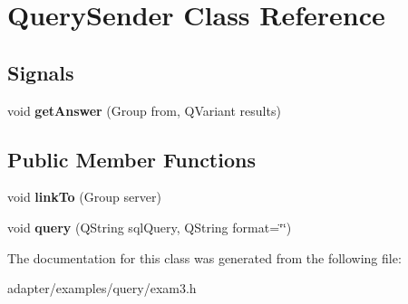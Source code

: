 \hypertarget{classQuerySender}{
\section{QuerySender Class Reference}
\label{classQuerySender}
}
\subsection*{Signals}
\begin{DoxyCompactItemize}
\item 
\hypertarget{classQuerySender_ae0295b63e8c81d285f83f152db5fe724}{
void {\bfseries getAnswer} (Group from, QVariant results)}
\label{classQuerySender_ae0295b63e8c81d285f83f152db5fe724}

\end{DoxyCompactItemize}
\subsection*{Public Member Functions}
\begin{DoxyCompactItemize}
\item 
\hypertarget{classQuerySender_a1c70fd551a21aaff8dbecdb4d2f2aee2}{
void {\bfseries linkTo} (Group server)}
\label{classQuerySender_a1c70fd551a21aaff8dbecdb4d2f2aee2}

\item 
\hypertarget{classQuerySender_a26e94e0a8f9d3db13f3e4246441ccac6}{
void {\bfseries query} (QString sqlQuery, QString format=\char`\"{}\char`\"{})}
\label{classQuerySender_a26e94e0a8f9d3db13f3e4246441ccac6}

\end{DoxyCompactItemize}


The documentation for this class was generated from the following file:\begin{DoxyCompactItemize}
\item 
adapter/examples/query/exam3.h\end{DoxyCompactItemize}
